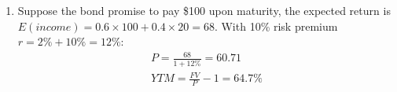 \documentclass{article}
\begin{document}
\begin{enumerate}[leftmargin=\labelsep]
  \item Suppose the bond promise to pay \$100 upon maturity, the expected return is $E(income) = 0.6 \times 100 + 0.4 \times 20 = 68$. With 10\% risk premium $r = 2\% + 10\% = 12\%$:
    \begin{gather*}
      P = \frac{68}{1 + 12\%} = 60.71 \\
      YTM = \frac{FV}{P} - 1 = 64.7 \%
    \end{gather*}
\end{enumerate}
\end{document}
